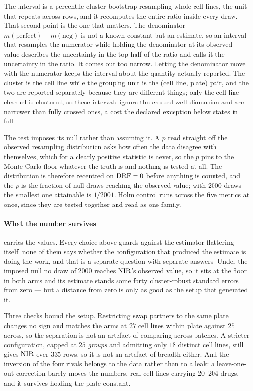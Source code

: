 The interval is a percentile cluster bootstrap resampling whole cell lines, the
unit that repeats across rows, and it recomputes the entire ratio inside every
draw. That second point is the one that matters. The denominator
$m(\textrm{perfect}) - m(\textrm{neg})$ is not a known constant but an estimate,
so an interval that resamples the numerator while holding the denominator at its
observed value describes the uncertainty in the top half of the ratio and calls
it the uncertainty in the ratio. It comes out too narrow. Letting the denominator
move with the numerator keeps the interval about the quantity actually reported.
The cluster is the cell line while the grouping unit is the (cell line, plate)
pair, and the two are reported separately because they are different things; only
the cell-line channel is clustered, so these intervals ignore the crossed well
dimension and are narrower than fully crossed ones, a cost the declared exception
below states in full.

The test imposes its null rather than assuming it. A $p$ read straight off the
observed resampling distribution asks how often the data disagree with
themselves, which for a clearly positive statistic is never, so the $p$ pins to
the Monte Carlo floor whatever the truth is and nothing is tested at all. The
distribution is therefore recentred on $\textrm{DRF} = 0$ before anything is counted, and
the $p$ is the fraction of null draws reaching the observed value; with
$\num{2000}$ draws the smallest one attainable is $1/2001$. Holm control runs
across the five metrics at once, since they are tested together and read as one
family.
\paragraph{What the number survives}  carries the values. Every
choice above guards against the estimator flattering itself; none of them says
whether the configuration that produced the estimate is doing the work, and that
is a separate question with separate answers. Under the imposed null no draw of
$\num{2000}$ reaches $\textrm{NIR}$'s observed value, so it sits at the floor in both
arms and its estimate stands some forty cluster-robust standard errors from zero
--- but a distance from zero is only as good as the setup that generated it.

Three checks bound the setup. Restricting swap partners to the same plate changes
no sign and matches the arms at $27$ cell lines within plate against $25$ across,
so the separation is not an artefact of comparing across batches. A stricter
configuration, capped at $25$ \emph{groups} and admitting only $18$ distinct cell
lines, still gives $\textrm{NIR}$  over $335$ rows, so it is
not an artefact of breadth either. And the inversion of the four rivals belongs
to the data rather than to a leak: a leave-one-out correction barely moves the
numbers, real cell lines carrying 20--204 drugs, and it survives holding the
plate constant.


